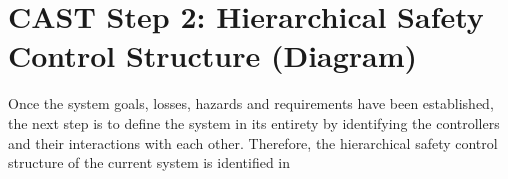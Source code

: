 \documentclass[12pt]{article}
\begin{document}













\section{CAST Step 2: Hierarchical Safety Control Structure (Diagram)}

Once the system goals, losses, hazards and requirements have been established, the next step is to define the system in its entirety by identifying the controllers and their interactions with each other. Therefore, the hierarchical safety control structure of the current system is identified in 
\end{document}
